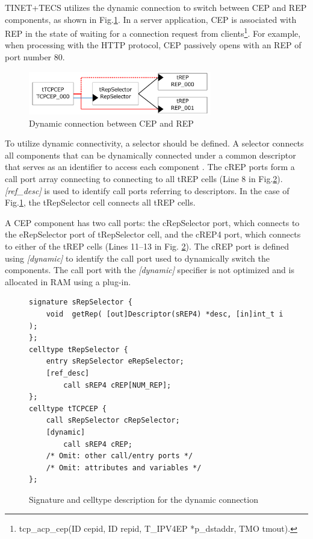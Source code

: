 \documentclass[a4j,12pt,oneside,openany,english]{jsbook}
\begin{document}
TINET+TECS utilizes the dynamic connection to switch between CEP and REP components, as shown in Fig.\ref{fig:DynamicConnectionUseCase}.
In a server application, CEP is associated with REP in the state of waiting for a connection request from clients\footnote{tcp\_acp\_cep(ID cepid, ID repid, T\_IPV4EP *p\_dstaddr, TMO tmout).}.
For example, when processing with the HTTP protocol, CEP passively opens with an REP of port number 80.

\begin{figure}[t]
    \centering
    \includegraphics[width=8.0cm,clip]{figure/DynamicConnectionUseCase.pdf}
    \caption{Dynamic connection between CEP and REP}
    \label{fig:DynamicConnectionUseCase}
\end{figure}

To utilize dynamic connectivity, a selector should be defined.
A selector connects all components that can be dynamically connected under a common descriptor that serves as an identifier to access each component \cite{par:optimization}.
The cREP ports form a call port array connecting to connecting to all tREP cells (Line 8 in Fig.\ref{src:DynamicCDLcode}).
{\it [ref\_desc]} is used to identify call ports referring to descriptors. 
In the case of Fig.\ref{fig:DynamicConnectionUseCase}, the tRepSelector cell connects all tREP cells.

A CEP component has two call ports: the cRepSelector port, which connects to the eRepSelector port of tRepSelector cell, and the cREP4 port, which connects to either of the tREP cells (Lines 11--13 in Fig. \ref{src:DynamicCDLcode}).
The cREP port is defined using {\it [dynamic]} to identify the call port used to dynamically switch the components.
The call port with the {\it [dynamic]} specifier is not optimized and is allocated in RAM using a plug-in.

\begin{figure}[t]
\centering
\begin{lstlisting}
signature sRepSelector {
    void  getRep( [out]Descriptor(sREP4) *desc, [in]int_t i );
};
celltype tRepSelector {
    entry sRepSelector eRepSelector;
    [ref_desc]
        call sREP4 cREP[NUM_REP];
};
celltype tTCPCEP {
    call sRepSelector cRepSelector;
    [dynamic]
        call sREP4 cREP;
    /* Omit: other call/entry ports */
    /* Omit: attributes and variables */
};
\end{lstlisting}
\caption{Signature and celltype description for the dynamic connection}
\label{src:DynamicCDLcode}
\end{figure}
\end{document}
